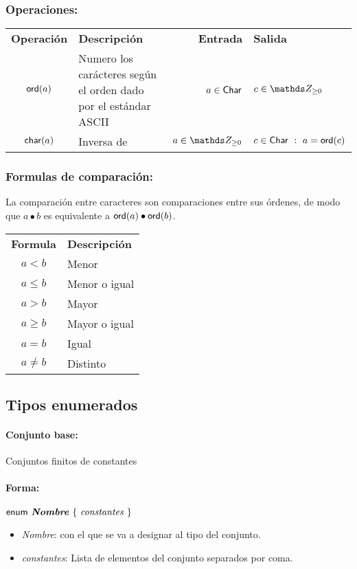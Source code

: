 \subsubsection*{Operaciones:}
\begin{tabular}{cp{6cm}rl}
	\textbf{Operación} & \textbf{Descripción} & \textbf{Entrada} & \textbf{Salida} \\
	$\mathsf{ord}(a)$ &  Numero los carácteres según el orden dado por el estándar ASCII & $a \in \mathsf{Char}$ & $c\in\ent_{\geq0}$\\
	$\mathsf{char}(a)$ &  Inversa de \ord{} & $a \in \ent_{\geq 0}$ & $c\in\mathsf{Char}~:~ a = \mathsf{ord}(c)$\\
\end{tabular}

\subsubsection*{Formulas de comparación:}
La comparación entre caracteres son comparaciones entre sus órdenes, de modo que $a \bullet b$ es equivalente a $\mathsf{ord}(a)\bullet\mathsf{ord}(b)$.

\vspace*{2mm}
\begin{tabular}{cl}
	\textbf{Formula} & \textbf{Descripción} \\
	$a<b$ &  Menor \\
	$a\leq b$ &  Menor o igual\\
	$a > b$ &  Mayor \\
	$a \geq b$ & Mayor o igual \\
	$a = b$ & Igual\\
	$a \neq b$ & Distinto \\
\end{tabular}
\subsection{Tipos enumerados}
\paragraph{Conjunto base:} Conjuntos finitos de constantes
\paragraph{Forma:}
\begin{center}
	$\mathsf{enum} ~\text{\normalfont\bfseries \textit{Nombre}} ~\{ ~\text{\textit{constantes}}~ \}$    
\end{center}
\begin{itemize}
	\item \textit{Nombre}: con el que se va a designar al tipo del conjunto.
	\item \textit{constantes}: Lista de elementos del conjunto separados por coma.
\end{itemize}

